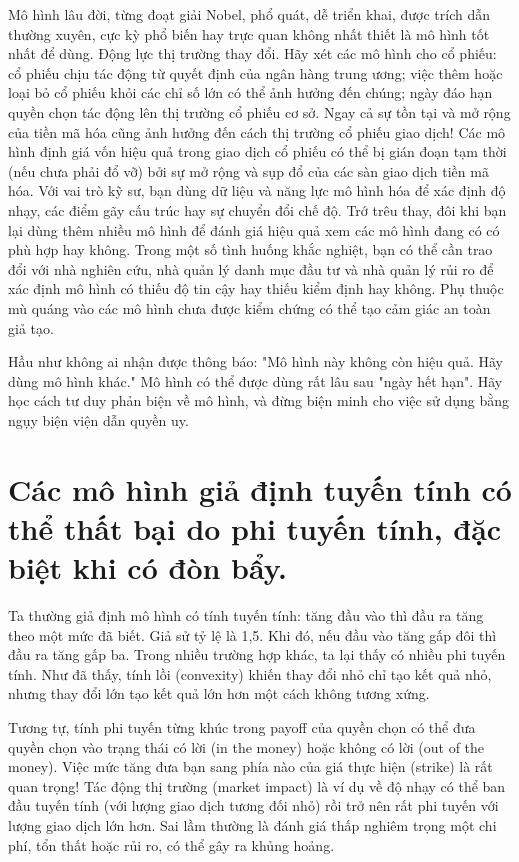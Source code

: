Mô hình lâu đời, từng đoạt giải Nobel, phổ quát, dễ triển khai, được trích dẫn thường xuyên, cực kỳ phổ biến hay trực quan không nhất thiết là mô hình tốt nhất để dùng. Động lực thị trường thay đổi. Hãy xét các mô hình cho cổ phiếu: cổ phiếu chịu tác động từ quyết định của ngân hàng trung ương; việc thêm hoặc loại bỏ cổ phiếu khỏi các chỉ số lớn có thể ảnh hưởng đến chúng; ngày đáo hạn quyền chọn tác động lên thị trường cổ phiếu cơ sở. Ngay cả sự tồn tại và mở rộng của tiền mã hóa cũng ảnh hưởng đến cách thị trường cổ phiếu giao dịch! Các mô hình định giá vốn hiệu quả trong giao dịch cổ phiếu có thể bị gián đoạn tạm thời (nếu chưa phải đổ vỡ) bởi sự mở rộng và sụp đổ của các sàn giao dịch tiền mã hóa. Với vai trò kỹ sư, bạn dùng dữ liệu và năng lực mô hình hóa để xác định độ nhạy, các điểm gãy cấu trúc hay sự chuyển đổi chế độ. Trớ trêu thay, đôi khi bạn lại dùng thêm nhiều mô hình để đánh giá hiệu quả xem các mô hình đang có có phù hợp hay không. Trong một số tình huống khắc nghiệt, bạn có thể cần trao đổi với nhà nghiên cứu, nhà quản lý danh mục đầu tư và nhà quản lý rủi ro để xác định mô hình có thiếu độ tin cậy hay thiếu kiểm định hay không. Phụ thuộc mù quáng vào các mô hình chưa được kiểm chứng có thể tạo cảm giác an toàn giả tạo.

Hầu như không ai nhận được thông báo: "Mô hình này không còn hiệu quả. Hãy dùng mô hình khác." Mô hình có thể được dùng rất lâu sau "ngày hết hạn". Hãy học cách tư duy phản biện về mô hình, và đừng biện minh cho việc sử dụng bằng ngụy biện viện dẫn quyền uy.

\section{Các mô hình giả định tuyến tính có thể thất bại do phi tuyến tính, đặc biệt khi có đòn bẩy.}

Ta thường giả định mô hình có tính tuyến tính: tăng đầu vào thì đầu ra tăng theo một mức đã biết. Giả sử tỷ lệ là 1,5. Khi đó, nếu đầu vào tăng gấp đôi thì đầu ra tăng gấp ba. Trong nhiều trường hợp khác, ta lại thấy có nhiều phi tuyến tính. Như đã thấy, tính lồi (convexity) khiến thay đổi nhỏ chỉ tạo kết quả nhỏ, nhưng thay đổi lớn tạo kết quả lớn hơn một cách không tương xứng.

Tương tự, tính phi tuyến từng khúc trong payoff của quyền chọn có thể đưa quyền chọn vào trạng thái có lời (in the money) hoặc không có lời (out of the money). Việc mức tăng đưa bạn sang phía nào của giá thực hiện (strike) là rất quan trọng! Tác động thị trường (market impact) là ví dụ về độ nhạy có thể ban đầu tuyến tính (với lượng giao dịch tương đối nhỏ) rồi trở nên rất phi tuyến với lượng giao dịch lớn hơn. Sai lầm thường là đánh giá thấp nghiêm trọng một chi phí, tổn thất hoặc rủi ro, có thể gây ra khủng hoảng.

